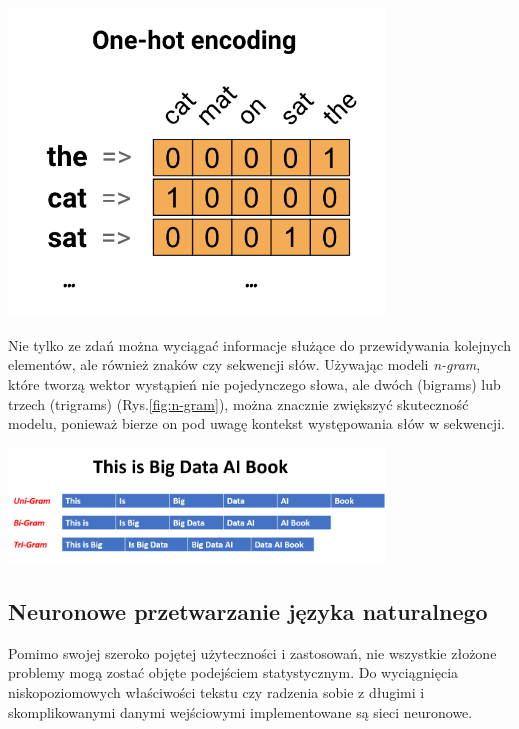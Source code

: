 \begin{center}
    \includegraphics[width=10cm]{files/one-hot.png}
    \label{fig:one-hot}
\end{center}

Nie tylko ze zdań można wyciągać informacje służące do przewidywania kolejnych elementów, ale również znaków czy sekwencji słów. Używając modeli \textit{n-gram}, które tworzą wektor wystąpień nie pojedynczego słowa, ale dwóch (bigrams) lub trzech (trigrams) (Rys.\ref{fig:n-gram}), można znacznie zwiększyć skuteczność modelu, ponieważ bierze on pod uwagę kontekst występowania słów w sekwencji. 
\begin{center}
    \includegraphics[width=10cm]{files/n-grams.png}
    \label{fig:n-gram}
\end{center}


\subsection{Neuronowe przetwarzanie języka naturalnego}
\label{subsec:neural}

Pomimo swojej szeroko pojętej użyteczności i zastosowań, nie wszystkie złożone problemy mogą zostać objęte podejściem statystycznym. Do wyciągnięcia niskopoziomowych właściwości tekstu czy radzenia sobie z długimi i skomplikowanymi danymi wejściowymi implementowane są sieci neuronowe. 

